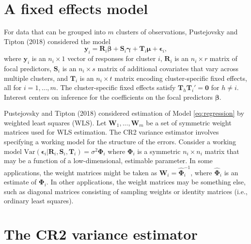 \documentclass[12pt]{article}
\begin{document}
\hypertarget{a-fixed-effects-model}{%
\section{A fixed effects model}\label{a-fixed-effects-model}}

For data that can be grouped into \(m\) clusters of observations,
Pustejovsky and Tipton (2018) considered the model \begin{equation}
\label{eq:regression}
\mathbf{y}_i = \mathbf{R}_i \boldsymbol\beta + \mathbf{S}_i \boldsymbol\gamma + \mathbf{T}_i \boldsymbol\mu + \boldsymbol\epsilon_i,
\end{equation} where \(\mathbf{y}_i\) is an \(n_i \times 1\) vector of
responses for cluster \(i\), \(\mathbf{R}_i\) is an \(n_i \times r\)
matrix of focal predictors, \(\mathbf{S}_i\) is an \(n_i \times s\)
matrix of additional covariates that vary across multiple clusters, and
\(\mathbf{T}_i\) is an \(n_i \times t\) matrix encoding cluster-specific
fixed effects, all for \(i = 1,...,m\). The cluster-specific fixed
effects satisfy \(\mathbf{T}_h \mathbf{T}_i' = \mathbf{0}\) for
\(h \neq i\). Interest centers on inference for the coefficients on the
focal predictors \(\boldsymbol\beta\).

Pustejovsky and Tipton (2018) considered estimation of Model
\ref{eq:regression} by weighted least squares (WLS). Let
\(\mathbf{W}_1,...,\mathbf{W}_m\) be a set of symmetric weight matrices
used for WLS estimation. The CR2 variance estimator involves specifying
a working model for the structure of the errors. Consider a working
model
\(\text{Var}\left(\boldsymbol\epsilon_i | \mathbf{R}_i, \mathbf{S}_i, \mathbf{T}_i\right) = \sigma^2 \boldsymbol\Phi_i\)
where \(\boldsymbol\Phi_i\) is a symmetric \(n_i \times n_i\) matrix
that may be a function of a low-dimensional, estimable parameter. In
some applications, the weight matrices might be taken as
\(\mathbf{W}_i = \boldsymbol{\hat\Phi}_i^{-1}\), where
\(\boldsymbol{\hat\Phi}_i\) is an estimate of \(\boldsymbol\Phi_i\). In
other applications, the weight matrices may be something else, such as
diagonal matrices consisting of sampling weights or identity matrices
(i.e., ordinary least squares).

\hypertarget{the-cr2-variance-estimator}{%
\section{The CR2 variance estimator}\label{the-cr2-variance-estimator}}
\end{document}
